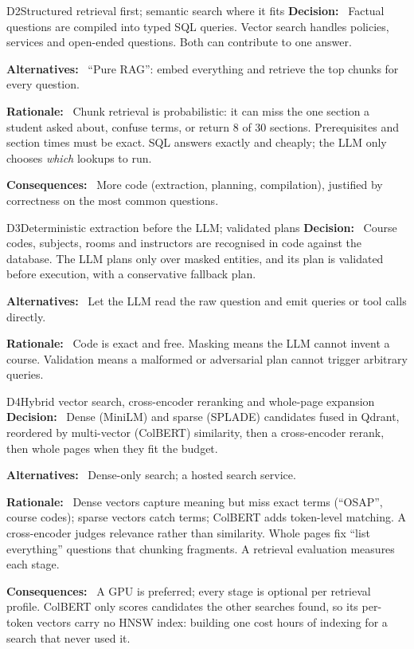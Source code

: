 \documentclass[11pt,letterpaper]{report}
\newcommand{\field}[1]{\textbf{\color{lauPurple}#1:}~}
\begin{document}
\begin{decision}{D2}{Structured retrieval first; semantic search where it fits}
\field{Decision} Factual questions are compiled into typed SQL queries. Vector search handles policies,
services and open-ended questions. Both can contribute to one answer.\par
\field{Alternatives} ``Pure RAG'': embed everything and retrieve the top chunks for every question.\par
\field{Rationale} Chunk retrieval is probabilistic: it can miss the one section a student asked about,
confuse terms, or return 8 of 30 sections. Prerequisites and section times must be exact. SQL answers
exactly and cheaply; the LLM only chooses \emph{which} lookups to run.\par
\field{Consequences} More code (extraction, planning, compilation), justified by correctness on the most
common questions.
\end{decision}

\begin{decision}{D3}{Deterministic extraction before the LLM; validated plans}
\field{Decision} Course codes, subjects, rooms and instructors are recognised in code against the
database. The LLM plans only over masked entities, and its plan is validated before execution, with a
conservative fallback plan.\par
\field{Alternatives} Let the LLM read the raw question and emit queries or tool calls directly.\par
\field{Rationale} Code is exact and free. Masking means the LLM cannot invent a course. Validation means
a malformed or adversarial plan cannot trigger arbitrary queries.
\end{decision}

\begin{decision}{D4}{Hybrid vector search, cross-encoder reranking and whole-page expansion}
\field{Decision} Dense (MiniLM) and sparse (SPLADE) candidates fused in Qdrant, reordered by
multi-vector (ColBERT) similarity, then a cross-encoder rerank, then whole pages when they fit the
budget.\par
\field{Alternatives} Dense-only search; a hosted search service.\par
\field{Rationale} Dense vectors capture meaning but miss exact terms (``OSAP'', course codes); sparse
vectors catch terms; ColBERT adds token-level matching. A cross-encoder judges relevance rather than
similarity. Whole pages fix ``list everything'' questions that chunking fragments. A retrieval
evaluation measures each stage.\par
\field{Consequences} A GPU is preferred; every stage is optional per retrieval profile. ColBERT only
scores candidates the other searches found, so its per-token vectors carry no HNSW index: building one
cost hours of indexing for a search that never used it.
\end{decision}
\end{document}
